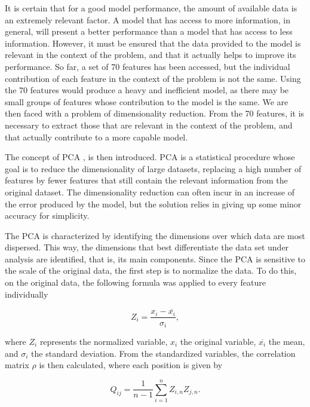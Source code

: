 It is certain that for a good model performance, the amount of available data is an extremely relevant factor. A model that has access to more information, in general, will present a better performance than a model that has access to less information. However, it must be ensured that the data provided to the model is relevant in the context of the problem, and that it actually helps to improve its performance. So far, a set of 70 features has been accessed, but the individual contribution of each feature in the context of the problem is not the same. Using the 70 features would produce a heavy and inefficient model, as there may be small groups of features whose contribution to the model is the same. We are then faced with a problem of dimensionality reduction. From the 70 features, it is necessary to extract those that are relevant in the context of the problem, and that actually contribute to a more capable model.

The concept of \ac{PCA} \cite{pca}, is then introduced. \ac{PCA} is a statistical procedure whose goal is to reduce the dimensionality of large datasets, replacing a high number of features by fewer features that still contain the relevant information from the original dataset. The dimensionality reduction can often incur in an increase of the error produced by the model, but the solution relies in giving up some minor accuracy for simplicity.


The \ac{PCA} is characterized by identifying the dimensions over which data are most dispersed. This way, the dimensions that best differentiate the data set under analysis are identified, that is, its main components. Since the \ac{PCA} is sensitive to the scale of the original data, the first step is to normalize the data. To do this, on the original data, the following formula was applied to every feature individually

\begin{equation}
   Z_i = \frac{x_i-\overline{x_i}}{\sigma_i},
   \label{PCA1}
\end{equation}

where $Z_i$ represents the normalized variable, $x_i$ the original variable, $\overline{x_i}$ the mean, and $\sigma_i$ the standard deviation. From the standardized variables, the correlation matrix $\rho$ is then calculated, where each position is given by


\begin{equation}
   Q_{ij} = \frac{1}{n-1}\sum_{i=1}^nZ_{i,n}Z_{j,n}.
   \label{PCA2}
\end{equation}

